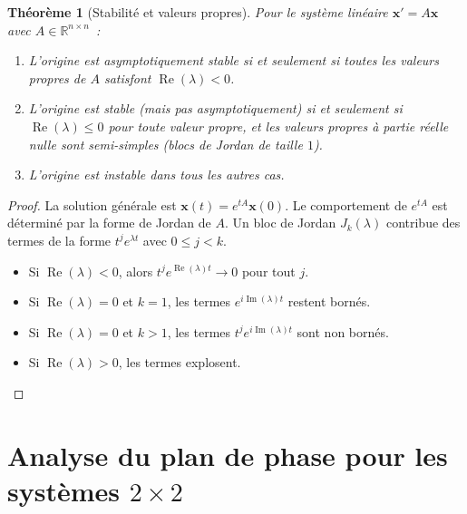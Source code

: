 \documentclass[12pt,a4paper,openany]{book}
\theoremstyle{definition}
\theoremstyle{plain}
\newtheorem{theoreme}[definition]{Théorème}
\theoremstyle{remark}
\newcommand{\R}{\mathbb{R}}
\begin{document}
\begin{theoreme}[Stabilité et valeurs propres]\label{thm:stab-vp}
  Pour le système linéaire $\mathbf{x}'=A\mathbf{x}$ avec
  $A\in\R^{n\times n}$~:
  \begin{enumerate}[label=(\roman*)]
    \item L'origine est \emph{asymptotiquement stable} si et
      seulement si toutes les valeurs propres de $A$ satisfont
      $\operatorname{Re}(\lambda)<0$.
    \item L'origine est \emph{stable} (mais pas asymptotiquement) si
      et seulement si $\operatorname{Re}(\lambda)\leq 0$ pour toute
      valeur propre, et les valeurs propres à partie réelle nulle
      sont semi-simples (blocs de Jordan de taille $1$).
    \item L'origine est \emph{instable} dans tous les autres cas.
  \end{enumerate}
\end{theoreme}

\begin{proof}
  La solution générale est $\mathbf{x}(t)=e^{tA}\mathbf{x}(0)$. Le
  comportement de $e^{tA}$ est déterminé par la forme de Jordan de
  $A$. Un bloc de Jordan $J_k(\lambda)$ contribue des termes de la
  forme $t^j e^{\lambda t}$ avec $0\leq j<k$.
  \begin{itemize}
    \item Si $\operatorname{Re}(\lambda)<0$, alors
      $t^j e^{\operatorname{Re}(\lambda)t}\to 0$ pour tout $j$.
    \item Si $\operatorname{Re}(\lambda)=0$ et $k=1$, les termes
      $e^{i\operatorname{Im}(\lambda)t}$ restent bornés.
    \item Si $\operatorname{Re}(\lambda)=0$ et $k>1$, les termes
      $t^j e^{i\operatorname{Im}(\lambda)t}$ sont non bornés.
    \item Si $\operatorname{Re}(\lambda)>0$, les termes explosent.
      \qedhere
  \end{itemize}
\end{proof}

\section{Analyse du plan de phase pour les systèmes $2\times 2$}\label{sec:plan-phase}

\end{document}
